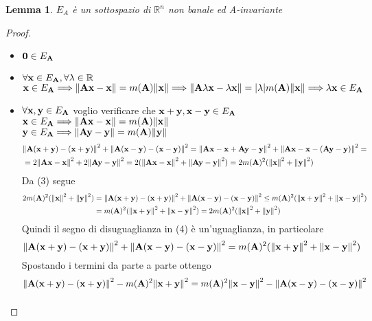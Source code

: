 \documentclass[10pt,a4paper]{article}
\newtheorem{lemma}[theorem]{Lemma}
\begin{document}
\begin{lemma}
$E_A$ è un sottospazio di $\mathbb{R}^{n}$ non banale ed A-invariante
\end{lemma} 
\begin{proof}
\begin{itemize}
\item $\vb{0} \in E_{\vb{A}} $  
\item $\forall \vb{x} \in E_{\vb{A}}, \forall \lambda \in \mathbb{R}$ \\
$\vb{x} \in E_{\vb{A}} \Longrightarrow \norm{\vb{Ax-x}} = m(\vb{A})\norm{\vb{x}} \Longrightarrow \norm{\vb{A} \lambda \vb{x} -\lambda \vb{x}}= | \lambda | m(\vb{A}) \norm{\vb{x}}  \Longrightarrow \lambda \vb{x} \in E_{\vb{A}} $
\item $\forall \vb{x, y} \in E_{\vb{A}} $ voglio verificare che $\vb{x+y, x-y} \in E_{\vb{A}}$ \\
$\vb{x} \in E_{\vb{A}} \Longrightarrow \norm{\vb{Ax-x}} = m(\vb{A})\norm{\vb{x}}$ \\
$\vb{y} \in E_{\vb{A}} \Longrightarrow \norm{\vb{Ay-y}} = m(\vb{A})\norm{\vb{y}}$ 
\begin{equation} 
\begin{split}
& \norm{\vb{A(x+y) - (x+y)}}^2 + \norm{\vb{A(x-y) - (x-y)}}^2  = \norm{\vb{Ax - x + Ay -y}}^2 + \norm{\vb{Ax - x -(Ay -y)}}^2 = \\
& = 2 \norm{\vb{Ax-x}}^2 + 2 \norm{\vb{Ay -y}}^2  = 2( \norm{\vb{Ax-x}}^2 + \norm{\vb{Ay-y}}^2) = 2m(\vb{A})^2(\norm{\vb{x}}^2 + \norm{\vb{y}}^2) 
\end{split}
\end{equation}
Da (3) segue 
\begin{equation} 
\begin{split}
2m(\vb{A})^2(\norm{\vb{x}}^2 + \norm{\vb{y}}^2) & = \norm{\vb{A(x+y) - (x+y)}}^2 + \norm{\vb{A(x-y) - (x-y)}}^2 \leq m(\vb{A})^2(\norm{\vb{x+y}}^2 + \norm{\vb{x-y}}^2) \\ 
& = m(\vb{A})^2(\norm{\vb{x+y}}^2 + \norm{\vb{x-y}}^2)  = 2m(\vb{A})^2(\norm{\vb{x}}^2 + \norm{\vb{y}}^2)
\end{split}
\end{equation}
Quindi il segno di disuguaglianza in (4) è un'uguaglianza, in particolare 
\[   \norm{\vb{A(x+y) - (x+y)}}^2 + \norm{\vb{A(x-y) - (x-y)}}^2  = m(\vb{A})^2(\norm{\vb{x+y}}^2 + \norm{\vb{x-y}}^2)  \]
Spostando i termini da parte a parte ottengo
\[ \norm{\vb{A(x+y) - (x+y)}}^2 - m(\vb{A})^2 \norm{\vb{x+y}}^2=  m(\vb{A})^2 \norm{\vb{x-y}}^2 - \norm{\vb{A(x-y) - (x-y)}}^2 \]
\begin{equation} 

\end{equation}
\end{itemize}
\end{proof}
\end{document}
